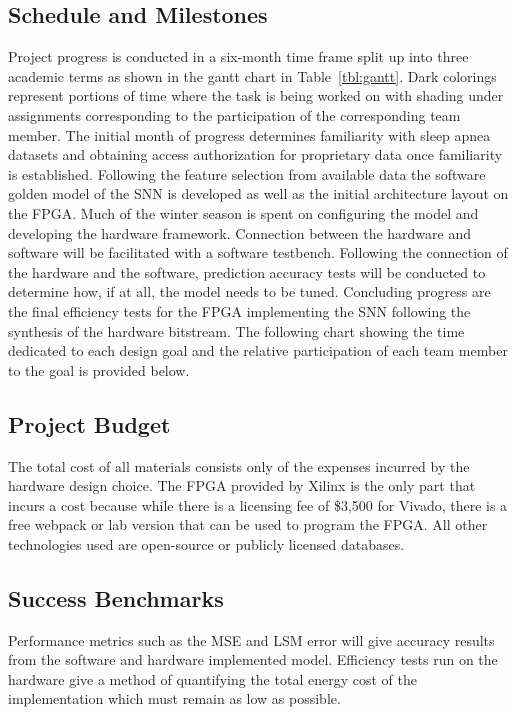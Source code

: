 \documentclass[12pt,titlepage]{article}
\begin{document}
\subsection{Schedule and Milestones}
Project progress is conducted in a six-month time frame split up into three academic terms as shown in the gantt chart in Table~\ref{tbl:gantt}.
Dark colorings represent portions of time where the task is being worked on with shading under assignments corresponding to the participation of
the corresponding team member. The initial month of progress determines familiarity with sleep
apnea datasets and obtaining access authorization for proprietary data once familiarity is established. Following the feature selection from available data
the software golden model of the SNN is developed as well as the initial architecture layout on the FPGA. Much of the winter season is spent on configuring
the model and developing the hardware framework. Connection between the hardware and software will be facilitated with a software testbench. Following the
connection of the hardware and the software, prediction accuracy tests will be conducted to determine how, if at all, the model needs to be tuned. Concluding
progress are the final efficiency tests for the FPGA implementing the SNN following the synthesis of the hardware bitstream. The following chart showing the
time dedicated to each design goal and the relative participation of each team member to the goal is provided below.

\subsection{Project Budget}
The total cost of all materials consists only of the expenses incurred by the hardware design choice. The FPGA provided by Xilinx is the only part that
incurs a cost because while there is a licensing fee of \$3,500 for Vivado, there is a free webpack or lab version that can be used to program the FPGA.
All other technologies used are open-source or publicly licensed databases.

\subsection{Success Benchmarks}
Performance metrics such as the MSE and LSM error will give accuracy results from the software and hardware implemented model. Efficiency tests run on the
hardware give a method of quantifying the total energy cost of the implementation which must remain as low as possible. 
\end{document}
